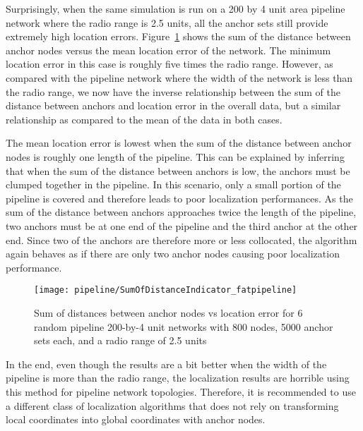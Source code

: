 Surprisingly, when the same simulation is run on a 200 by 4 unit area pipeline network where the radio range is 2.5 units, all the anchor sets still provide extremely high location errors.  Figure~\ref{fig:fatpipelineindicator} shows the sum of the distance between anchor nodes versus the mean location error of the network.  The minimum location error in this case is roughly five times the radio range.  However, as compared with the pipeline network where the width of the network is less than the radio range, we now have the inverse relationship between the sum of the distance between anchors and location error in the overall data, but a similar relationship as compared to the mean of the data in both cases.  

The mean location error is lowest when the sum of the distance between anchor nodes is roughly one length of the pipeline.  This can be explained by inferring that when the sum of the distance between anchors is low, the anchors must be clumped together in the pipeline.  In this scenario, only a small portion of the pipeline is covered and therefore leads to poor localization performances. As the sum of the distance between anchors approaches twice the length of the pipeline, two anchors must be at one end of the pipeline and the third anchor at the other end.  Since two of the anchors are therefore more or less collocated, the algorithm again behaves as if there are only two anchor nodes causing poor localization performance.

\begin{figure}
  \centering
	\texttt{[image: pipeline/SumOfDistanceIndicator\_fatpipeline]}
	\caption[Sum of distances between anchor nodes vs location error in a pipeline topology]{Sum of distances between anchor nodes vs location error for 6 random pipeline 200-by-4 unit networks with 800 nodes, 5000 anchor sets each, and a radio range of 2.5 units}
	\label{fig:fatpipelineindicator}
\end{figure}

In the end, even though the results are a bit better when the width of the pipeline is more than the radio range, the localization results are horrible using this method for pipeline network topologies.  Therefore, it is recommended to use a different class of localization algorithms that does not rely on transforming local coordinates into global coordinates with anchor nodes.
